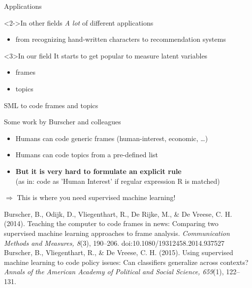 \documentclass{beamer}
\begin{document}
\begin{frame}{Applications}
\begin{block}<2->{In other fields}
\emph{A lot} of different applications
\begin{itemize}
\item from recognizing hand-written characters to recommendation systems
\end{itemize}
\end{block}

\begin{block}<3>{In our field}
It starts to get popular to measure latent variables
\begin{itemize}
\item frames
\item topics
\end{itemize}
\end{block}
\end{frame}



\begin{frame}{SML to code frames and topics}
\begin{block}{Some work by Burscher and colleagues}
\begin{itemize}
\item Humans can code generic frames (human-interest, economic, \ldots)
\item Humans can code topics from a pre-defined list 
\item<2->\textbf{But it is very hard to formulate an explicit rule} \\(as in: code as 'Human Interest' if regular expression R is matched)
\end{itemize}
$\Rightarrow$ This is where you need supervised machine learning!
\end{block}
\tiny{Burscher, B., Odijk, D., Vliegenthart, R., De Rijke, M., \& De Vreese, C. H. (2014). Teaching the computer to code frames in news: Comparing two supervised machine learning approaches to frame analysis. \emph{Communication Methods and Measures, 8}(3), 190–206. doi:10.1080/19312458.2014.937527
\\
Burscher, B., Vliegenthart, R., \& De Vreese, C. H. (2015). Using supervised machine learning to code policy issues: Can classifiers generalize across contexts? \emph{Annals of the American Academy of Political and Social Science, 659}(1), 122–131.
}

\end{frame}
\end{document}
